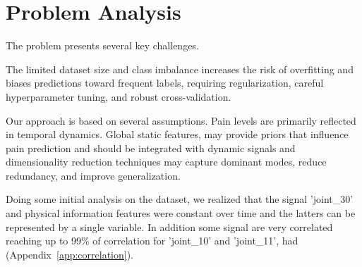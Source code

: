 \vspace{-10pt}
\section{Problem Analysis}
\label{sec:problem}
\vspace{-10pt}
The problem presents several key challenges. 

The limited dataset size and class imbalance increases the risk of overfitting and biases predictions toward frequent labels, requiring regularization, careful hyperparameter tuning, and robust cross-validation.

Our approach is based on several assumptions. Pain levels are primarily reflected in temporal dynamics.
Global static features, may provide priors that influence pain prediction and should be integrated with dynamic signals and dimensionality reduction techniques may capture dominant modes, reduce redundancy, and improve generalization. 

Doing some initial analysis on the dataset, we realized that the signal 'joint\_30' and physical information features were constant over time and the latters can be represented by a single variable. In addition some signal are very correlated reaching up to 99\% of correlation for 'joint\_10' and 'joint\_11', had  (Appendix~\ref{app:correlation}).

